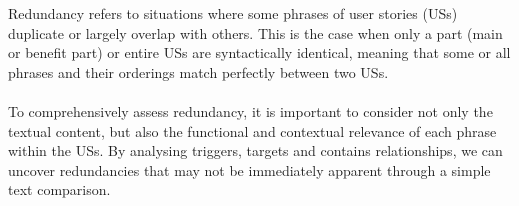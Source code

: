 \begin{definition}
	Redundancy refers to situations where some phrases of user stories (USs) duplicate or largely overlap with others. This is the case when only a part (main or benefit part) or entire USs are syntactically identical, meaning that some or all phrases and their orderings match perfectly between two USs. \\\\
	To comprehensively assess redundancy, it is important to consider not only the textual content, but also the functional and contextual relevance of each phrase within the USs. By analysing triggers, targets and contains relationships, we can uncover redundancies that may not be immediately apparent through a simple text comparison.
\end{definition}	

